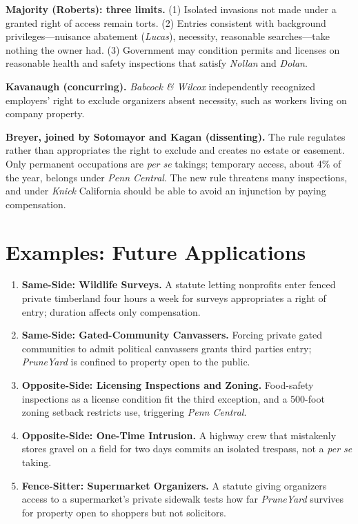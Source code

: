 \documentclass[12pt]{article}
\begin{document}
\textbf{Majority (Roberts): three limits.} (1) Isolated invasions not made under a granted right of access remain torts. (2) Entries consistent with background privileges---nuisance abatement (\textit{Lucas}), necessity, reasonable searches---take nothing the owner had. (3) Government may condition permits and licenses on reasonable health and safety inspections that satisfy \textit{Nollan} and \textit{Dolan}.

\textbf{Kavanaugh (concurring).} \textit{Babcock \& Wilcox} independently recognized employers' right to exclude organizers absent necessity, such as workers living on company property.

\textbf{Breyer, joined by Sotomayor and Kagan (dissenting).} The rule regulates rather than appropriates the right to exclude and creates no estate or easement. Only permanent occupations are \emph{per se} takings; temporary access, about 4\% of the year, belongs under \textit{Penn Central}. The new rule threatens many inspections, and under \textit{Knick} California should be able to avoid an injunction by paying compensation.

\section{Examples: Future Applications}

\begin{enumerate}
\item \textbf{Same-Side: Wildlife Surveys.} A statute letting nonprofits enter fenced private timberland four hours a week for surveys appropriates a right of entry; duration affects only compensation.
\item \textbf{Same-Side: Gated-Community Canvassers.} Forcing private gated communities to admit political canvassers grants third parties entry; \textit{PruneYard} is confined to property open to the public.
\item \textbf{Opposite-Side: Licensing Inspections and Zoning.} Food-safety inspections as a license condition fit the third exception, and a 500-foot zoning setback restricts use, triggering \textit{Penn Central}.
\item \textbf{Opposite-Side: One-Time Intrusion.} A highway crew that mistakenly stores gravel on a field for two days commits an isolated trespass, not a \emph{per se} taking.
\item \textbf{Fence-Sitter: Supermarket Organizers.} A statute giving organizers access to a supermarket's private sidewalk tests how far \textit{PruneYard} survives for property open to shoppers but not solicitors.
\end{enumerate}
\end{document}
